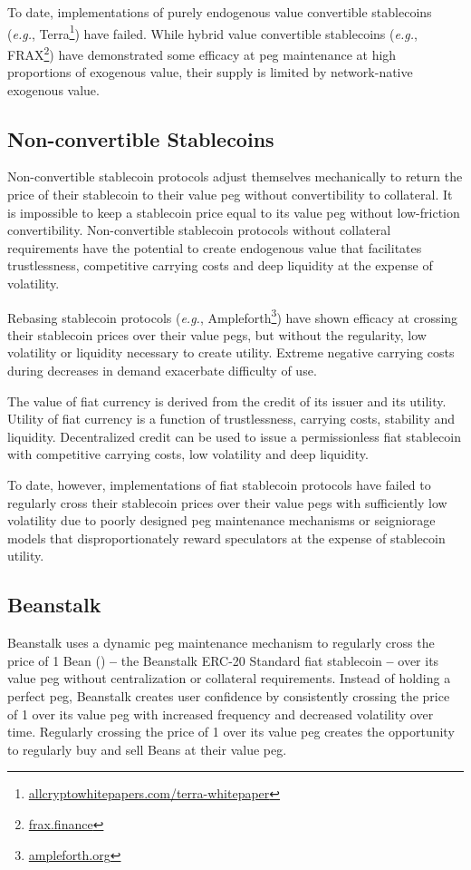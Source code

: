 \documentclass[tikz]{article}
\newcommand{\term}[1]{\textsl{#1}}
\newcommand{\fref}[1]{\footnote{\href{http://#1}{#1}}}
\newcommand{\Bean}{} %
\begin{document}
To date, implementations of purely endogenous value convertible stablecoins (\term{e.g.}, Terra\fref{allcryptowhitepapers.com/terra-whitepaper}) have failed. While hybrid value convertible stablecoins (\term{e.g.}, FRAX\fref{frax.finance}) have demonstrated some efficacy at peg maintenance at high proportions of exogenous value, their supply is limited by network-native exogenous value. 

\vspace*{-1.5mm}
\subsection{Non-convertible Stablecoins}
\vspace*{-1.5mm}
Non-convertible stablecoin protocols adjust themselves mechanically to return the price of their stablecoin to their value peg without convertibility to collateral. It is impossible to keep a stablecoin price equal to its value peg without low-friction convertibility. Non-convertible stablecoin protocols without collateral requirements have the potential to create endogenous value that facilitates trustlessness, competitive carrying costs and deep liquidity at the expense of volatility. 

Rebasing stablecoin protocols (\term{e.g.}, Ampleforth\fref{ampleforth.org}) have shown efficacy at crossing their stablecoin prices over their value pegs, but without the regularity, low volatility or liquidity necessary to create utility. Extreme negative carrying costs during decreases in demand exacerbate difficulty of use.

The value of fiat currency is derived from the credit of its issuer and its utility. Utility of fiat currency is a function of trustlessness, carrying costs, stability and liquidity. Decentralized credit can be used to issue a permissionless fiat stablecoin with competitive carrying costs, low volatility and deep liquidity.

To date, however, implementations of fiat stablecoin protocols have failed to regularly cross their stablecoin prices over their value pegs with sufficiently low volatility due to poorly designed peg maintenance mechanisms or seigniorage models that disproportionately reward speculators at the expense of stablecoin utility. 

\subsection{Beanstalk}
Beanstalk uses a dynamic peg maintenance mechanism to regularly cross the price of 1 Bean (\Bean) \textbf{--} the Beanstalk ERC-20 Standard fiat stablecoin \textbf{--} over its value peg without centralization or collateral requirements. Instead of holding a perfect peg, Beanstalk creates user confidence by consistently crossing the price of \Bean1 over its value peg with increased frequency and decreased volatility over time. Regularly crossing the price of \Bean1 over its value peg creates the opportunity to regularly buy and sell Beans at their value peg.
\end{document}
